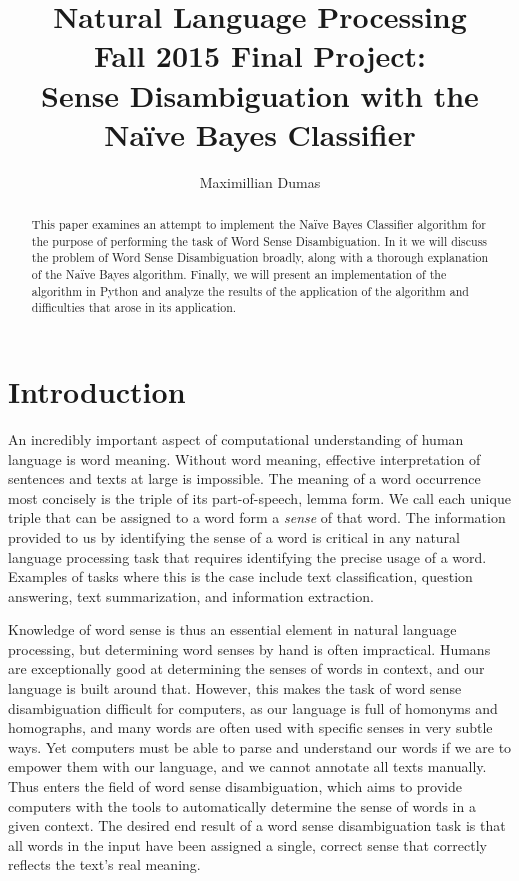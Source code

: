 \documentclass[11pt]{article}
\title{Natural Language Processing\\
Fall 2015 Final Project:\\
Sense Disambiguation with the\\
Na\"ive Bayes Classifier}
\author{Maximillian Dumas}
\begin{document}
\maketitle

\begin{abstract}
This paper examines an attempt to implement the Na\"ive Bayes Classifier algorithm for the purpose of performing the task of Word Sense Disambiguation. In it we will discuss the problem of Word Sense Disambiguation broadly, along with a thorough explanation of the Na\"ive Bayes algorithm. Finally, we will present an implementation of the algorithm in Python and analyze the results of the application of the algorithm and difficulties that arose in its application.
\end{abstract}

\section{Introduction}
An incredibly important aspect of computational understanding of human language is word meaning. Without word meaning, effective interpretation of sentences and texts at large is impossible. The meaning of a word occurrence most concisely is the triple of its part-of-speech, lemma form. We call each unique triple that can be assigned to a word form a \emph{sense} of that word. The information provided to us by identifying the sense of a word is critical in any natural language processing task that requires identifying the precise usage of a word. Examples of tasks where this is the case include text classification, question answering, text summarization, and information extraction.

Knowledge of word sense is thus an essential element in natural language processing, but determining word senses by hand is often impractical. Humans are exceptionally good at determining the senses of words in context, and our language is built around that. However, this makes the task of word sense disambiguation difficult for computers, as our language is full of homonyms and homographs, and many words are often used with specific senses in very subtle ways. Yet computers must be able to parse and understand our words if we are to empower them with our language, and we cannot annotate all texts manually. Thus enters the field of word sense disambiguation, which aims to provide computers with the tools to automatically determine the sense of words in a given context. The desired end result of a word sense disambiguation task is that all words in the input have been assigned a single, correct sense that correctly reflects the text's real meaning.
\end{document}
